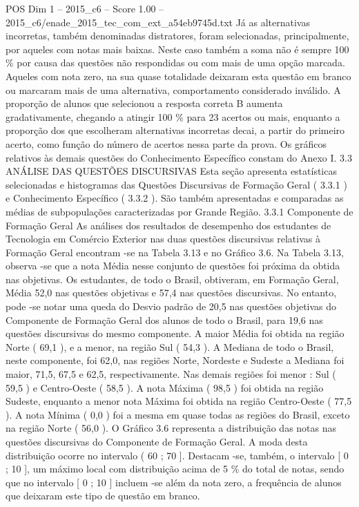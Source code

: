 \begin{textsample}{POS Dim 1 – 2015\_c6 – Score 1.00 – 2015\_c6/enade\_2015\_tec\_com\_ext\_a54eb9745d.txt}
Já as alternativas incorretas, também denominadas distratores, foram selecionadas, principalmente, por aqueles com notas mais baixas.
Neste caso também a soma não é sempre 100 \% por causa das questões não respondidas ou com mais de uma opção marcada.
Aqueles com nota zero, na sua quase totalidade deixaram esta questão em branco ou marcaram mais de uma alternativa, comportamento considerado inválido.
A proporção de alunos que selecionou a resposta correta B aumenta gradativamente, chegando a atingir 100 \% para 23 acertos ou mais, enquanto a proporção dos que escolheram alternativas incorretas decai, a partir do primeiro acerto, como função do número de acertos nessa parte da prova.
Os gráficos relativos às demais questões do Conhecimento Específico constam do Anexo I. 3.3 ANÁLISE DAS QUESTÕES DISCURSIVAS Esta seção apresenta estatísticas selecionadas e histogramas das Questões Discursivas de Formação Geral ( 3.3.1 ) e Conhecimento Específico ( 3.3.2 ).
São também apresentadas e comparadas as médias de subpopulações caracterizadas por Grande Região. 3.3.1 Componente de Formação Geral As análises dos resultados de desempenho dos estudantes de Tecnologia em Comércio Exterior nas duas questões discursivas relativas à Formação Geral encontram -se na Tabela 3.13 e no Gráfico 3.6.
Na Tabela 3.13, observa -se que a nota Média nesse conjunto de questões foi próxima da obtida nas objetivas.
Os estudantes, de todo o Brasil, obtiveram, em Formação Geral, Média 52,0 nas questões objetivas e 57,4 nas questões discursivas.
No entanto, pode -se notar uma queda do Desvio padrão de 20,5 nas questões objetivas do Componente de Formação Geral dos alunos de todo o Brasil, para 19,6 nas questões discursivas do mesmo componente.
A maior Média foi obtida na região Norte ( 69,1 ), e a menor, na região Sul ( 54,3 ).
A Mediana de todo o Brasil, neste componente, foi 62,0, nas regiões Norte, Nordeste e Sudeste a Mediana foi maior, 71,5, 67,5 e 62,5, respectivamente.
Nas demais regiões foi menor : Sul ( 59,5 ) e Centro-Oeste ( 58,5 ).
A nota Máxima ( 98,5 ) foi obtida na região Sudeste, enquanto a menor nota Máxima foi obtida na região Centro-Oeste ( 77,5 ).
A nota Mínima ( 0,0 ) foi a mesma em quase todas as regiões do Brasil, exceto na região Norte ( 56,0 ).
O Gráfico 3.6 representa a distribuição das notas nas questões discursivas do Componente de Formação Geral.
A moda desta distribuição ocorre no intervalo ( 60 ; 70 ].
Destacam -se, também, o intervalo [ 0 ; 10 ], um máximo local com distribuição acima de 5 \% do total de notas, sendo que no intervalo [ 0 ; 10 ] incluem -se além da nota zero, a frequência de alunos que deixaram este tipo de questão em branco.

\end{textsample}
